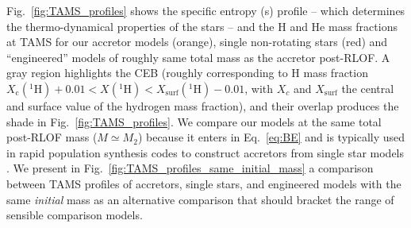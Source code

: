 \documentclass[twocolumn,twocolappendix,trackchanges]{aastex63}
\DeclareRobustCommand{\Eqref}[1]{Eq.~\ref{#1}}
\DeclareRobustCommand{\Figref}[1]{Fig.~\ref{#1}}
\begin{document}
\Figref{fig:TAMS_profiles} shows the specific entropy (s) profile --
which determines the thermo-dynamical properties of the stars -- and
the H and He mass fractions at TAMS for our accretor models (orange),
single non-rotating stars (red) and ``engineered'' models of roughly
same total mass as the accretor post-RLOF. A gray region highlights
the CEB (roughly corresponding to H mass fraction
$X_\mathrm{c}(^1\mathrm{H})+0.01<X(^1\mathrm{H})<X_\mathrm{surf}(^1\mathrm{H})-0.01$,
with $X_c$ and $X_\mathrm{surf}$ the central and surface value of the
hydrogen mass fraction), and their overlap produces the shade in
\Figref{fig:TAMS_profiles}.
We compare our
models at the same total post-RLOF mass ($M\simeq M_{2}$) because it enters in \Eqref{eq:BE} and
is typically used in rapid population synthesis codes to construct
accretors from single star models \citep[e.g.,][]{hurley:2002}.  We present in
\Figref{fig:TAMS_profiles_same_initial_mass} a comparison between TAMS profiles of
accretors, single stars, and engineered models with the same
\emph{initial} mass as an alternative comparison that should bracket
the range of sensible comparison models.
\end{document}
